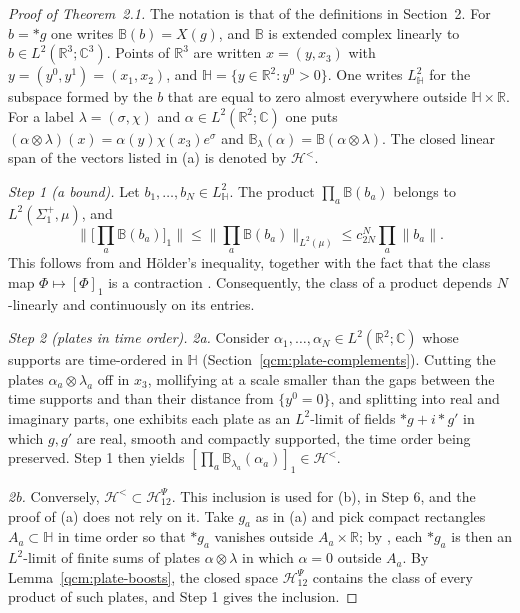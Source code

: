 \documentclass[11pt,letterpaper,reqno]{amsart}
\theoremstyle{definition}
\begin{document}
\begin{proof}[Proof of Theorem~2.1]
The notation is that of the definitions in Section~2.
For $b=\ast g$ one writes $\mathbb B(b)=X(g)$, and $\mathbb B$ is extended complex linearly to $b\in L^2(\mathbb R^3;\mathbb C^3)$.
Points of $\mathbb R^3$ are written $x=(y,x_3)$ with $y=(y^0,y^1)=(x_1,x_2)$, and $\mathbb H=\{y\in\mathbb R^2:y^0>0\}$.
One writes $L^2_{\mathbb H}$ for the subspace formed by the $b$ that are equal to zero almost everywhere outside $\mathbb H\times\mathbb R$.
For a label $\lambda=(\sigma,\chi)$ and $\alpha\in L^2(\mathbb R^2;\mathbb C)$ one puts $(\alpha\otimes\lambda)(x)=\alpha(y)\chi(x_3)e^\sigma$ and $\mathbb B_\lambda(\alpha)=\mathbb B(\alpha\otimes\lambda)$.
The closed linear span of the vectors listed in (a) is denoted by $\mathcal H^{<}$.

\emph{Step 1 (a bound).}
Let $b_1,\dots,b_N\in L^2_{\mathbb H}$.
The product $\prod_a\mathbb B(b_a)$ belongs to $L^2(\Sigma_1^+,\mu)$, and
\begin{equation*}
\Big\|\Big[\prod_a\mathbb B(b_a)\Big]_1\Big\|\le\Big\|\prod_a\mathbb B(b_a)\Big\|_{L^2(\mu)}\le c_{2N}^N\prod_a\|b_a\|.
\end{equation*}
This follows from \cite[Proposition~5.1]{QEDConstruction} and H\"older's inequality, together with the fact that the class map $\Phi\mapsto[\Phi]_1$ is a contraction \cite[Sections~5.2 and~7.4]{QEDConstruction}.
Consequently, the class of a product depends $N$-linearly and continuously on its entries.

\emph{Step 2 (plates in time order).}
\emph{2a.} Consider $\alpha_1,\dots,\alpha_N\in L^2(\mathbb R^2;\mathbb C)$ whose supports are time-ordered in $\mathbb H$ (Section~\ref{qcm:plate-complements}).
Cutting the plates $\alpha_a\otimes\lambda_a$ off in $x_3$, mollifying at a scale smaller than the gaps between the time supports and than their distance from $\{y^0=0\}$, and splitting into real and imaginary parts, one exhibits each plate as an $L^2$-limit of fields $\ast g+i\ast g'$ in which $g,g'$ are real, smooth and compactly supported, the time order being preserved.
Step 1 then yields $[\prod_a\mathbb B_{\lambda_a}(\alpha_a)]_1\in\mathcal H^{<}$.

\emph{2b.} Conversely, $\mathcal H^{<}\subset\mathcal H^{\Psi}_{12}$.
This inclusion is used for (b), in Step 6, and the proof of (a) does not rely on it.
Take $g_a$ as in (a) and pick compact rectangles $A_a\subset\mathbb H$ in time order so that $\ast g_a$ vanishes outside $A_a\times\mathbb R$; by \cite[Section~8.2]{QEDConstruction}, each $\ast g_a$ is then an $L^2$-limit of finite sums of plates $\alpha\otimes\lambda$ in which $\alpha=0$ outside $A_a$.
By Lemma~\ref{qcm:plate-boosts}, the closed space $\mathcal H^{\Psi}_{12}$ contains the class of every product of such plates, and Step 1 gives the inclusion.


\end{proof}
\end{document}
